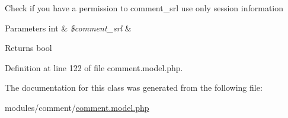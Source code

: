 Check if you have a permission to comment\+\_\+srl use only session information 
\begin{DoxyParams}[1]{Parameters}
int & {\em \$comment\+\_\+srl} & \\
\hline
\end{DoxyParams}
\begin{DoxyReturn}{Returns}
bool 
\end{DoxyReturn}


Definition at line 122 of file comment.\+model.\+php.



The documentation for this class was generated from the following file\+:\begin{DoxyCompactItemize}
\item 
modules/comment/\hyperlink{comment_8model_8php}{comment.\+model.\+php}\end{DoxyCompactItemize}
